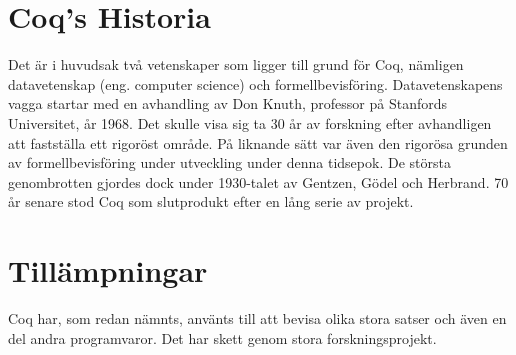 \section{Coq's Historia}
Det är i huvudsak två vetenskaper som ligger till grund för Coq, nämligen
datavetenskap (eng. computer science) och formellbevisföring. Datavetenskapens
vagga startar med en avhandling av Don Knuth, professor på Stanfords
Universitet, år 1968. Det skulle visa sig ta 30 år av forskning efter
avhandligen att fastställa ett rigoröst område. På liknande sätt var även den
rigorösa grunden av formellbevisföring under utveckling under denna tidsepok.
De största genombrotten gjordes dock under 1930-talet av Gentzen, Gödel och
Herbrand. 70 år senare stod Coq som slutprodukt efter en lång serie av projekt.

\section{Tillämpningar}
Coq har, som redan nämnts, använts till att bevisa olika stora satser och även
en del andra programvaror. Det har skett genom stora forskningsprojekt.

